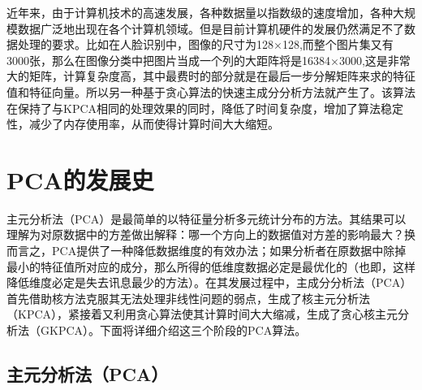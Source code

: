 \documentclass[10pt,a4paper]{article}
\begin{document}
\begin{CJK*}{UTF8}{song}
近年来，由于计算机技术的高速发展，各种数据量以指数级的速度增加，各种大规模数据广泛地出现在各个计算机领域。但是目前计算机硬件的发展仍然满足不了数据处理的要求。比如在人脸识别中，图像的尺寸为128×128,而整个图片集又有3000张，那么在图像分类中把图片当成一个列的大距阵将是16384×3000,这是非常大的矩阵，计算复杂度高，其中最费时的部分就是在最后一步分解矩阵\cite{2}来求的特征值和特征向量。所以另一种基于贪心算法的快速主成分分析方法就产生了。该算法在保持了与KPCA相同的处理效果的同时，降低了时间复杂度，增加了算法稳定性，减少了内存使用率，从而使得计算时间大大缩短。
\newpage

\section{PCA的发展史}
主元分析法（PCA）是最简单的以特征量分析多元统计分布的方法。其结果可以理解为对原数据中的方差做出解释：哪一个方向上的数据值对方差的影响最大？换而言之，PCA提供了一种降低数据维度的有效办法；如果分析者在原数据中除掉最小的特征值所对应的成分，那么所得的低维度数据必定是最优化的（也即，这样降低维度必定是失去讯息最少的方法）。在其发展过程中，主成分分析法（PCA）首先借助核方法克服其无法处理非线性问题的弱点，生成了核主元分析法（KPCA），紧接着又利用贪心算法使其计算时间大大缩减，生成了贪心核主元分析法（GKPCA）。下面将详细介绍这三个阶段的PCA算法。

\subsection{主元分析法（PCA）}

\end{CJK*}
\end{document}
